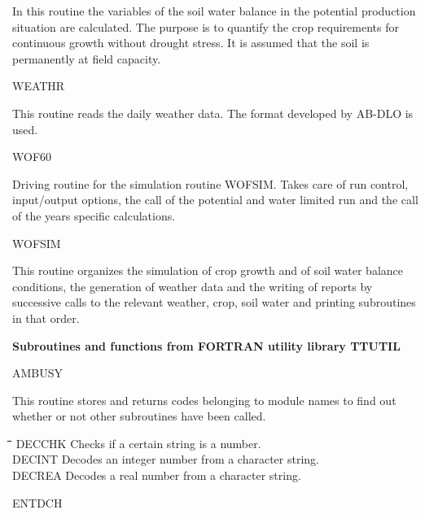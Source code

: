 \documentclass[11pt]{article}
\begin{document}
\begin{indenting}{2.54cm}
In this routine the variables of the soil water balance in the potential
production situation are calculated. The purpose is to quantify the crop
requirements for continuous growth without drought stress. It is as\-sumed
that the soil is permanently at field capacity.
\end{indenting}
WEATHR
\testlastline

\begin{indenting}{2.54cm}
This routine reads the daily weather data. The format developed by AB-DLO is used.
\end{indenting}
WOF60
\testlastline

\begin{indenting}{2.54cm}
Driving routine for the simulation routine WOFSIM. Takes care of run
control, input/output options, the call of the potential and water limited run
and the call of the years specific calculations.
\end{indenting}
WOFSIM
\testlastline

\begin{indenting}{2.54cm}
This routine organizes the simulation of crop growth and of soil water
balance conditions, the generation of weather data and the writing of
reports by successive calls to the relevant weather, crop, soil water and
printing subroutines in that order.
\end{indenting}

\bigskip
\bigskip
\bigskip
\bigskip
{\bf {\large Subroutines and functions from FORTRAN utility library TT\-UTIL}}

AMBUSY
\testlastline

\begin{indenting}{2.54cm}
This routine stores and returns codes belonging to module names to find
out whether or not other subroutines have been called.
\end{indenting}
\begin{tabbing}
\hspace{1.27cm}\=\hspace{1.27cm}\=\hspace{1.27cm}\=\hspace{1.27cm}\=%
\hspace{1.27cm}\=\hspace{1.27cm}\=\hspace{1.27cm}\=\hspace{1.27cm}\=%
\hspace{1.27cm}\=\hspace{1.27cm}\=\kill
DECCHK\> \> Checks if a certain string is a number.\\
DECINT\> \> Decodes an integer number from a character string.\\
DECREA\> \> Decodes a real number from a character string.
\end{tabbing}
ENTDCH
\testlastline
\end{document}
